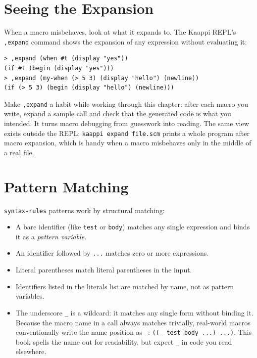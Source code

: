 \section{Seeing the Expansion}

When a macro misbehaves, look at what it expands to. The Kaappi REPL's \texttt{,expand} command shows the expansion of any expression without evaluating it:

\begin{lstlisting}[style=repl]
> ,expand (when #t (display "yes"))
(if #t (begin (display "yes")))
> ,expand (my-when (> 5 3) (display "hello") (newline))
(if (> 5 3) (begin (display "hello") (newline)))
\end{lstlisting}

Make \texttt{,expand} a habit while working through this chapter: after each macro you write, expand a sample call and check that the generated code is what you intended. It turns macro debugging from guesswork into reading. The same view exists outside the REPL: \texttt{kaappi expand file.scm} prints a whole program after macro expansion, which is handy when a macro misbehaves only in the middle of a real file.

\section{Pattern Matching}

\texttt{syntax-rules} patterns work by structural matching:

\begin{itemize}
    \item A bare identifier (like \texttt{test} or \texttt{body}) matches any single expression and binds it as a \emph{pattern variable}.
    \item An identifier followed by \texttt{...} matches zero or more expressions.
    \item Literal parentheses match literal parentheses in the input.
    \item Identifiers listed in the literals list are matched by name, not as pattern variables.
    \item The underscore \texttt{\_} is a wildcard: it matches any single form without binding it. Because the macro name in a call always matches trivially, real-world macros conventionally write the name position as \texttt{\_}: \texttt{((\_ test body ...) ...)}. This book spells the name out for readability, but expect \texttt{\_} in code you read elsewhere.
\end{itemize}

